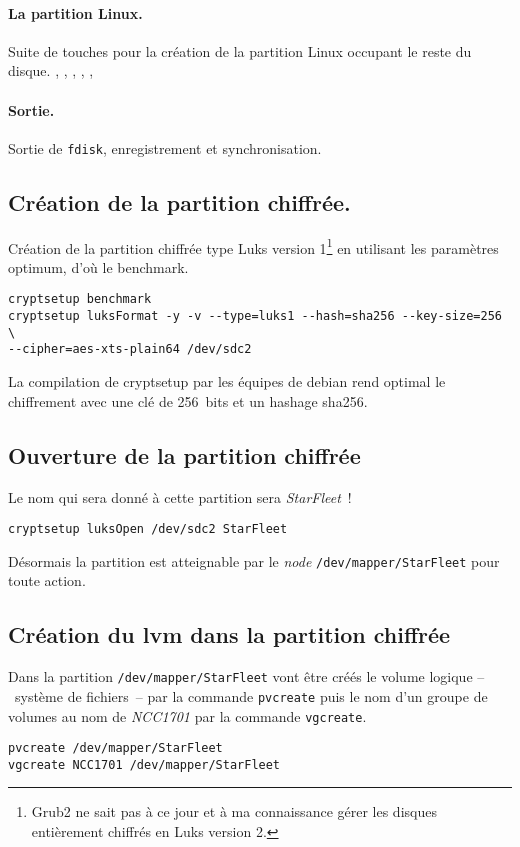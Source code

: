 \documentclass[12pt, a4paper]{article}
\begin{document}
\paragraph{La partition Linux.} Suite de touches pour la création de la partition Linux occupant le reste du disque. \newline
{}, , , , ,

\paragraph{Sortie.} Sortie de \texttt{fdisk}, enregistrement et synchronisation. \newline
{}

\subsection{Création de la partition chiffrée.}
Création de la partition chiffrée type Luks version 1\footnote{%
Grub2 ne sait pas à ce jour et à ma connaissance gérer les disques entièrement chiffrés en Luks version 2.} 
en utilisant les paramètres optimum, d'où le benchmark. 
\begin{verbatim}
cryptsetup benchmark
cryptsetup luksFormat -y -v --type=luks1 --hash=sha256 --key-size=256 \
--cipher=aes-xts-plain64 /dev/sdc2
\end{verbatim}
La compilation de cryptsetup par les équipes de debian rend optimal le chiffrement avec une clé de 256~bits et un hashage sha256.

\subsection{Ouverture de la partition chiffrée}
Le nom qui sera donné à cette partition sera \emph{StarFleet\/}~!
\begin{verbatim}
cryptsetup luksOpen /dev/sdc2 StarFleet
\end{verbatim}
Désormais la partition est atteignable par le \emph{node\/} \texttt{/dev/mapper/StarFleet} pour toute action.

\subsection{Création du lvm dans la partition chiffrée}
Dans la partition \texttt{/dev/mapper/StarFleet} vont être créés le volume logique --~système de fichiers~-- par la commande \texttt{pvcreate} puis le nom d'un groupe de volumes au nom de \emph{NCC1701\/} par la commande \texttt{vgcreate}.
\begin{verbatim}
pvcreate /dev/mapper/StarFleet
vgcreate NCC1701 /dev/mapper/StarFleet
\end{verbatim}
\end{document}
